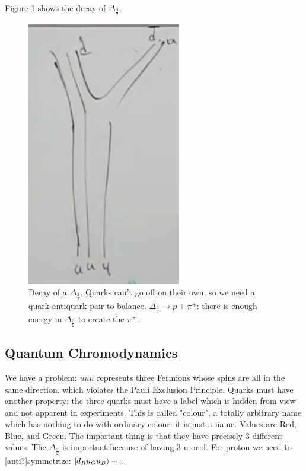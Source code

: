 \documentclass[]{article}
\begin{document}
Figure \ref{fig:decay:dalta} shows the decay of $\Delta_\frac{3}{2}$.

\begin{figure}[H]
	\begin{center}
		\caption[Decay of a $\Delta_\frac{3}{2}$]{Decay of a $\Delta_\frac{3}{2}$. Quarks can't go off on their own, so we need a quark-antiquark pair to balance. $\Delta_\frac{3}{2}\rightarrow p +\pi^+$: there is enough energy in $\Delta_\frac{3}{2}$ to create the $\pi^+$.}\label{fig:decay:dalta}
		\includegraphics[width=0.6\textwidth]{2-2-Delta-decay}
	\end{center}
\end{figure}

\subsection{Quantum Chromodynamics}

We have a problem: $uuu$ represents three Fermions whose spins are all in the same direction, which violates the Pauli Exclusion Principle. Quarks must have another property: the three quarks must have a label which is hidden from view and not apparent in experiments. This is called "colour", a totally arbitrary name which has nothing to do with ordinary colour: it is just a name. Values are Red, Blue, and Green. The important thing is that they have precisely 3 different values. The  $\Delta_\frac{3}{2}$ is important because of having 3 u or d. For proton we need to [anti?]symmetrize: $\ket{d_R u_G u_B}+...$
\end{document}
